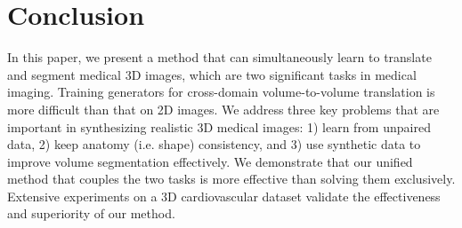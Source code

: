 \documentclass[10pt,twocolumn,letterpaper]{article}
\begin{document}
\vspace{-.1cm}
\section{Conclusion}
In this paper, we present a method that can simultaneously learn to translate and segment medical 3D images, which are two significant tasks in medical imaging. Training generators for cross-domain volume-to-volume translation is more difficult than that on 2D images. We address three key problems that are important in synthesizing realistic 3D medical images: 1) learn from unpaired data, 2) keep anatomy (i.e. shape) consistency, and 3) use synthetic data to improve volume segmentation effectively. We demonstrate that our unified method that couples the two tasks is more effective than solving them exclusively. Extensive experiments on a 3D cardiovascular dataset validate the effectiveness and superiority of our method. 


{\small


}
\end{document}
